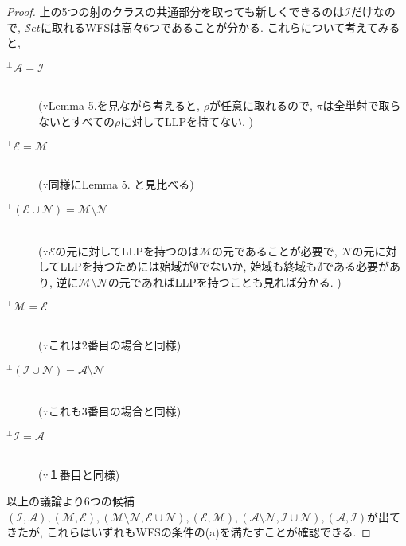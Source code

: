\documentclass[. /main]{subfiles}
\begin{document}
\begin{proof}
上の5つの射のクラスの共通部分を取っても新しくできるのは$\mathcal{I}$だけなので, $\mathcal{S}et$に取れるWFSは高々6つであることが分かる. これらについて考えてみると, 
\begin{description}
\item [${}^{\perp}\mathcal{A}=\mathcal{I}$] \mbox{}\\
        ($\because$Lemma 5.を見ながら考えると, $\rho$が任意に取れるので, $\pi$は全単射で取らないとすべての$\rho$に対してLLPを持てない. )
\item [${}^{\perp}\mathcal{E}=\mathcal{M}$]\mbox{}\\
        ($\because$同様にLemma 5. と見比べる)
\item [${}^{\perp}(\mathcal{E} \cup \mathcal{N})=\mathcal{M} \setminus \mathcal{N}$]\mbox{}\\
        ($\because$$\mathcal{E}$の元に対してLLPを持つのは$\mathcal{M}$の元であることが必要で, $\mathcal{N}$の元に対してLLPを持つためには始域が$\emptyset$でないか, 始域も終域も$\emptyset$である必要があり, 逆に$\mathcal{M} \setminus \mathcal{N}$の元であればLLPを持つことも見れば分かる. )
\item [${}^{\perp}\mathcal{M}=\mathcal{E}$]\mbox{}\\
        ($\because$これは2番目の場合と同様)
\item [${}^{\perp}(\mathcal{I} \cup \mathcal{N})=\mathcal{A} \setminus \mathcal{N}$]\mbox{}\\
        ($\because$これも3番目の場合と同様)
\item [${}^{\perp}\mathcal{I}=\mathcal{A}$]\mbox{}\\
        ($\because$１番目と同様)
\end{description}
以上の議論より6つの候補$(\mathcal{I},  \mathcal{A}),  (\mathcal{M},  \mathcal{E}),  (\mathcal{M} \setminus \mathcal{N},  \mathcal{E} \cup \mathcal{N}),  (\mathcal{E},  \mathcal{M}),  (\mathcal{A} \setminus \mathcal{N},  \mathcal{I} \cup \mathcal{N}),  (\mathcal{A},  \mathcal{I})$が出てきたが, これらはいずれもWFSの条件の(a)を満たすことが確認できる. 
\end{proof}
\end{document}
